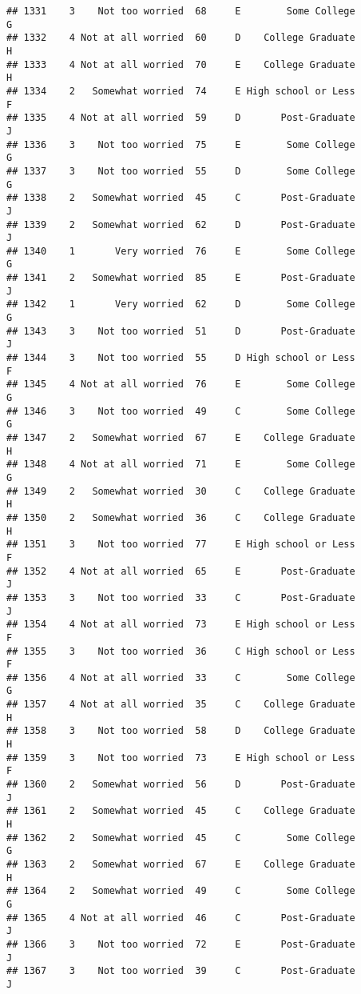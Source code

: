 \documentclass[
]{article}
\begin{document}
\begin{verbatim}
## 1331    3    Not too worried  68     E        Some College         G
## 1332    4 Not at all worried  60     D    College Graduate         H
## 1333    4 Not at all worried  70     E    College Graduate         H
## 1334    2   Somewhat worried  74     E High school or Less         F
## 1335    4 Not at all worried  59     D       Post-Graduate         J
## 1336    3    Not too worried  75     E        Some College         G
## 1337    3    Not too worried  55     D        Some College         G
## 1338    2   Somewhat worried  45     C       Post-Graduate         J
## 1339    2   Somewhat worried  62     D       Post-Graduate         J
## 1340    1       Very worried  76     E        Some College         G
## 1341    2   Somewhat worried  85     E       Post-Graduate         J
## 1342    1       Very worried  62     D        Some College         G
## 1343    3    Not too worried  51     D       Post-Graduate         J
## 1344    3    Not too worried  55     D High school or Less         F
## 1345    4 Not at all worried  76     E        Some College         G
## 1346    3    Not too worried  49     C        Some College         G
## 1347    2   Somewhat worried  67     E    College Graduate         H
## 1348    4 Not at all worried  71     E        Some College         G
## 1349    2   Somewhat worried  30     C    College Graduate         H
## 1350    2   Somewhat worried  36     C    College Graduate         H
## 1351    3    Not too worried  77     E High school or Less         F
## 1352    4 Not at all worried  65     E       Post-Graduate         J
## 1353    3    Not too worried  33     C       Post-Graduate         J
## 1354    4 Not at all worried  73     E High school or Less         F
## 1355    3    Not too worried  36     C High school or Less         F
## 1356    4 Not at all worried  33     C        Some College         G
## 1357    4 Not at all worried  35     C    College Graduate         H
## 1358    3    Not too worried  58     D    College Graduate         H
## 1359    3    Not too worried  73     E High school or Less         F
## 1360    2   Somewhat worried  56     D       Post-Graduate         J
## 1361    2   Somewhat worried  45     C    College Graduate         H
## 1362    2   Somewhat worried  45     C        Some College         G
## 1363    2   Somewhat worried  67     E    College Graduate         H
## 1364    2   Somewhat worried  49     C        Some College         G
## 1365    4 Not at all worried  46     C       Post-Graduate         J
## 1366    3    Not too worried  72     E       Post-Graduate         J
## 1367    3    Not too worried  39     C       Post-Graduate         J

\end{verbatim}
\end{document}
